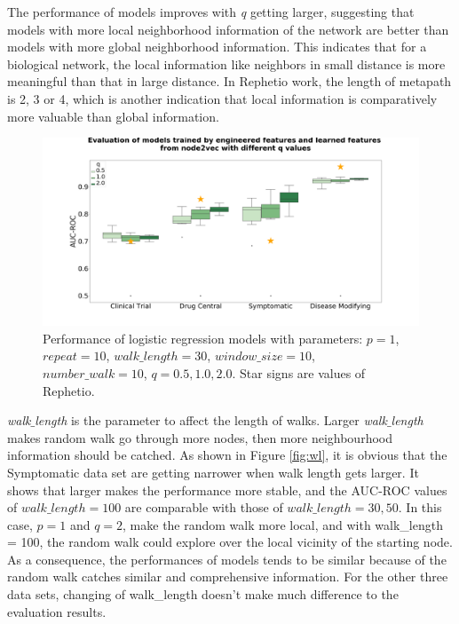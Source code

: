 The performance of models improves with \textit{q} getting larger, suggesting that models with more local neighborhood information of the network are better than models with more global neighborhood information. This indicates that for a biological network, the local information like neighbors in small distance is more meaningful than that in large distance. In Rephetio work, the length of metapath is 2, 3 or 4, which is another indication that local information is comparatively more valuable than global information.

\begin{figure}[!h]
    \centering
    \includegraphics[scale=0.2]
    {figures/pq.png}
    \captionsetup{justification=centering}
    \caption[Evaluation of different q in node2vec]{\label{fig:pq}Performance of logistic regression models with parameters: $p = 1$, $repeat = 10$, $walk\_length = 30$, $window\_size = 10$, $number\_walk = 10$, $q =0.5, 1.0, 2.0$. Star signs are values of Rephetio.
}
\end{figure}

\textit{walk$\_$length} is the parameter to affect the length of walks. Larger \textit{walk$\_$length} makes random walk go through more nodes, then more neighbourhood information should be catched. As shown in Figure \ref{fig:wl}, it is obvious that the Symptomatic data set are getting narrower when walk length gets larger. It shows that larger  makes the performance more stable, and the \ac{AUC-ROC} values of $walk\_length = 100$ are comparable with those of $walk\_length = 30, 50$. In this case, $p = 1$ and $q = 2$, make the random walk more local, and with walk\_length = 100, the random walk could explore over the local vicinity of the starting node. As a consequence, the performances of models tends to be similar because of the random walk catches similar and comprehensive information. For the other three data sets, changing of walk\_length doesn’t make much difference to the evaluation results.

